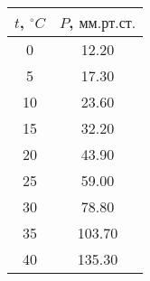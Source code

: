 \begin{tabular}{c|c}
\toprule
$t$, $^\circ C$ & $P$, $мм. рт. ст.$ \\
\midrule
0 & 12.20 \\
5 & 17.30 \\
10 & 23.60 \\
15 & 32.20 \\
20 & 43.90 \\
25 & 59.00 \\
30 & 78.80 \\
35 & 103.70 \\
40 & 135.30 \\
\bottomrule
\end{tabular}
